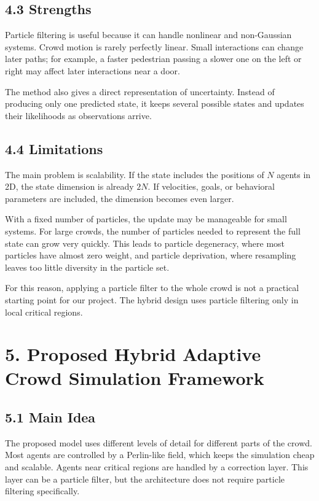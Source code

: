 \documentclass[
  11pt,
]{article}
\begin{document}
\subsection{4.3 Strengths}\label{strengths}

Particle filtering is useful because it can handle nonlinear and
non-Gaussian systems. Crowd motion is rarely perfectly linear. Small
interactions can change later paths; for example, a faster pedestrian
passing a slower one on the left or right may affect later interactions
near a door.

The method also gives a direct representation of uncertainty. Instead of
producing only one predicted state, it keeps several possible states and
updates their likelihoods as observations arrive.

\subsection{4.4 Limitations}\label{limitations-1}

The main problem is scalability. If the state includes the positions of
\(N\) agents in 2D, the state dimension is already \(2N\). If
velocities, goals, or behavioral parameters are included, the dimension
becomes even larger.

With a fixed number of particles, the update may be manageable for small
systems. For large crowds, the number of particles needed to represent
the full state can grow very quickly. This leads to particle degeneracy,
where most particles have almost zero weight, and particle deprivation,
where resampling leaves too little diversity in the particle set.

For this reason, applying a particle filter to the whole crowd is not a
practical starting point for our project. The hybrid design uses
particle filtering only in local critical regions.

\section{5. Proposed Hybrid Adaptive Crowd Simulation
Framework}\label{proposed-hybrid-adaptive-crowd-simulation-framework}

\subsection{5.1 Main Idea}\label{main-idea}

The proposed model uses different levels of detail for different parts
of the crowd. Most agents are controlled by a Perlin-like field, which
keeps the simulation cheap and scalable. Agents near critical regions
are handled by a correction layer. This layer can be a particle filter,
but the architecture does not require particle filtering specifically.
\end{document}

